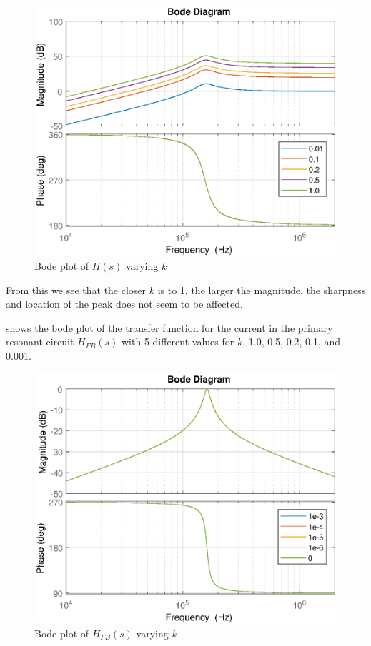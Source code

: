 \begin{figure}[H]
    \centering
    \includegraphics[width=\textwidth]{img/CoilRigBode_k.eps}
    \caption{Bode plot of $H(s)$ varying $k$}
    \label{fig:bode_k}
\end{figure}

From this we see that the closer $k$ is to 1, the larger the magnitude, the sharpness and location of the peak does not seem to be affected.

 shows the bode plot of the transfer function for the current in the primary resonant circuit $H_{FB}(s)$ with 5 different values for $k$, 1.0, 0.5, 0.2, 0.1, and 0.001.
\begin{figure}[H]
    \centering
    \includegraphics[width=\textwidth]{img/FeedBackBode_k.eps}
    \caption{Bode plot of $H_{FB}(s)$ varying $k$}
    \label{fig:fbbode_k}
\end{figure}

